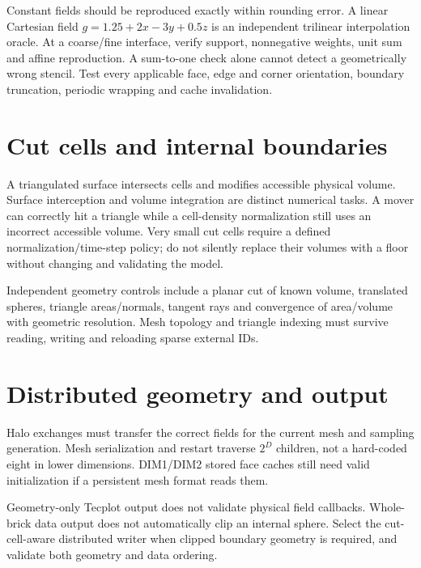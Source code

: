 Constant fields should be reproduced exactly within rounding error. A linear
Cartesian field
$g=1.25+2x-3y+0.5z$ is an independent trilinear interpolation oracle.
At a coarse/fine interface, verify support, nonnegative weights, unit sum and
affine reproduction. A sum-to-one check alone cannot detect a geometrically
wrong stencil. Test every applicable face, edge and corner orientation,
boundary truncation, periodic wrapping and cache invalidation.

\section{Cut cells and internal boundaries}
A triangulated surface intersects cells and modifies accessible physical
volume. Surface interception and volume integration are distinct numerical
tasks. A mover can correctly hit a triangle while a cell-density normalization
still uses an incorrect accessible volume. Very small cut cells require a
defined normalization/time-step policy; do not silently replace their volumes
with a floor without changing and validating the model.

Independent geometry controls include a planar cut of known volume,
translated spheres, triangle areas/normals, tangent rays and convergence of
area/volume with geometric resolution. Mesh topology and triangle indexing
must survive reading, writing and reloading sparse external IDs.

\section{Distributed geometry and output}
Halo exchanges must transfer the correct fields for the current mesh and
sampling generation. Mesh serialization and restart traverse $2^D$ children,
not a hard-coded eight in lower dimensions. DIM1/DIM2 stored face caches
still need valid initialization if a persistent mesh format reads them.

Geometry-only Tecplot output does not validate physical field callbacks.
Whole-brick data output does not automatically clip an internal sphere.
Select the cut-cell-aware distributed writer when clipped boundary geometry
is required, and validate both geometry and data ordering.
